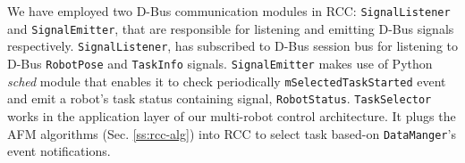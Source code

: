 \documentclass[journal]{IEEEtran}
\begin{document}
We have employed two D-Bus communication modules in RCC: \texttt{SignalListener} and \texttt{SignalEmitter}, that are responsible for listening and emitting D-Bus signals respectively. \texttt{SignalListener}, has subscribed to D-Bus session bus for listening  to D-Bus \texttt{RobotPose} and \texttt{TaskInfo} signals. \texttt{SignalEmitter} makes use of Python {\em sched} module that enables it to check periodically \texttt{mSelectedTaskStarted} event and emit a robot's task status containing signal, \texttt{RobotStatus}. \texttt{TaskSelector} works in the application layer of our multi-robot control architecture. It plugs the AFM algorithms (Sec. \ref{ss:rcc-alg}) into RCC to select task based-on \texttt{DataManger}'s event notifications.
\end{document}
